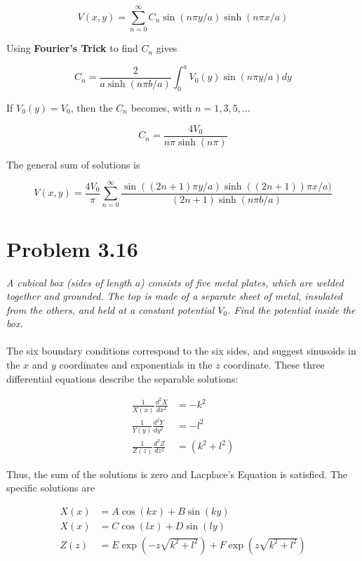 \documentclass[10pt]{article}
\begin{document}
\begin{equation}
V(x,y) = \sum_{n=0}^{\infty} C_n \sin(n\pi y/a) \sinh(n\pi x/a)
\end{equation}

Using \textbf{Fourier's Trick} to find $C_n$ gives

\begin{equation}
C_n = \frac{2}{a \sinh(n \pi b/a)}\int_0^{a} V_0(y) \sin(n\pi y/a) dy
\end{equation}

If $V_0(y) = V_0$, then the $C_n$ becomes, with $n = 1,3,5,...$

\begin{equation}
C_n = \frac{4V_0}{n\pi\sinh(n\pi)}
\end{equation}

The general sum of solutions is

\begin{equation}
V(x,y) = \frac{4V_0}{\pi}\sum_{n=0}^{\infty} \frac{\sin((2n+1)\pi y/a)\sinh((2n+1))\pi x/a)}{(2n+1)\sinh(n\pi b/a)}
\end{equation}

\section{Problem 3.16}

\textit{A cubical box (sides of length $a$) consists of five metal plates, which are welded together and grounded.  The top is made of a separate sheet of metal, insulated from the others, and held at a constant potential $V_0$.  Find the potential inside the box.} \\ \\

The six boundary conditions correspond to the six sides, and suggest sinusoids in the $x$ and $y$ coordinates and exponentials in the $z$ coordinate.  These three differential equations describe the separable solutions:

\begin{align}
\frac{1}{X(x)}\frac{d^2X}{dx^2} &= -k^2 \\
\frac{1}{Y(y)}\frac{d^2Y}{dy^2} &= -l^2 \\
\frac{1}{Z(z)}\frac{d^2Z}{dz^2} &= (k^2+l^2)
\end{align}

Thus, the sum of the solutions is zero and Lacplace's Equation is satisfied.  The specific solutions are 

\begin{align}
X(x) &= A\cos(kx) + B\sin(ky) \\
X(x) &= C\cos(lx) + D\sin(ly) \\
Z(z) &= E\exp(-z\sqrt{k^2+l^2}) + F\exp(z\sqrt{k^2+l^2})
\end{align}
\end{document}
